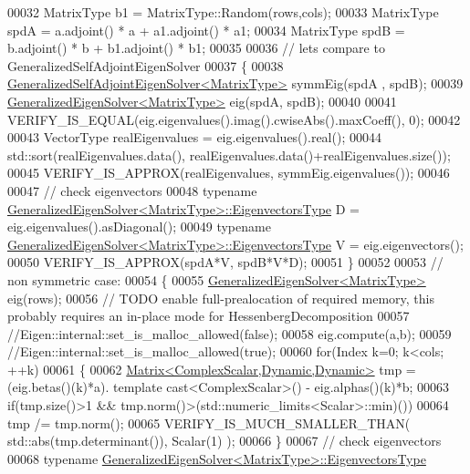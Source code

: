\begin{DoxyCode}
00032   MatrixType b1 = MatrixType::Random(rows,cols);
00033   MatrixType spdA =  a.adjoint() * a + a1.adjoint() * a1;
00034   MatrixType spdB =  b.adjoint() * b + b1.adjoint() * b1;
00035 
00036   \textcolor{comment}{// lets compare to GeneralizedSelfAdjointEigenSolver}
00037   \{
00038     \hyperlink{group___eigenvalues___module_class_eigen_1_1_generalized_self_adjoint_eigen_solver}{GeneralizedSelfAdjointEigenSolver<MatrixType>} symmEig(spdA
      , spdB);
00039     \hyperlink{group___eigenvalues___module_class_eigen_1_1_generalized_eigen_solver}{GeneralizedEigenSolver<MatrixType>} eig(spdA, spdB);
00040 
00041     VERIFY\_IS\_EQUAL(eig.eigenvalues().imag().cwiseAbs().maxCoeff(), 0);
00042 
00043     VectorType realEigenvalues = eig.eigenvalues().real();
00044     std::sort(realEigenvalues.data(), realEigenvalues.data()+realEigenvalues.size());
00045     VERIFY\_IS\_APPROX(realEigenvalues, symmEig.eigenvalues());
00046 
00047     \textcolor{comment}{// check eigenvectors}
00048     \textcolor{keyword}{typename} \hyperlink{group___core___module}{GeneralizedEigenSolver<MatrixType>::EigenvectorsType}
       D = eig.eigenvalues().asDiagonal();
00049     \textcolor{keyword}{typename} \hyperlink{group___core___module}{GeneralizedEigenSolver<MatrixType>::EigenvectorsType}
       V = eig.eigenvectors();
00050     VERIFY\_IS\_APPROX(spdA*V, spdB*V*D);
00051   \}
00052 
00053   \textcolor{comment}{// non symmetric case:}
00054   \{
00055     \hyperlink{group___eigenvalues___module_class_eigen_1_1_generalized_eigen_solver}{GeneralizedEigenSolver<MatrixType>} eig(rows);
00056     \textcolor{comment}{// TODO enable full-prealocation of required memory, this probably requires an in-place mode for
       HessenbergDecomposition}
00057     \textcolor{comment}{//Eigen::internal::set\_is\_malloc\_allowed(false);}
00058     eig.compute(a,b);
00059     \textcolor{comment}{//Eigen::internal::set\_is\_malloc\_allowed(true);}
00060     \textcolor{keywordflow}{for}(Index k=0; k<cols; ++k)
00061     \{
00062       \hyperlink{group___core___module_class_eigen_1_1_matrix}{Matrix<ComplexScalar,Dynamic,Dynamic>} tmp = (eig.betas()(k)*a).
      template cast<ComplexScalar>() - eig.alphas()(k)*b;
00063       \textcolor{keywordflow}{if}(tmp.size()>1 && tmp.norm()>(std::numeric\_limits<Scalar>::min)())
00064         tmp /= tmp.norm();
00065       VERIFY\_IS\_MUCH\_SMALLER\_THAN( std::abs(tmp.determinant()), Scalar(1) );
00066     \}
00067     \textcolor{comment}{// check eigenvectors}
00068     \textcolor{keyword}{typename} \hyperlink{group___core___module}{GeneralizedEigenSolver<MatrixType>::EigenvectorsType}

\end{DoxyCode}
